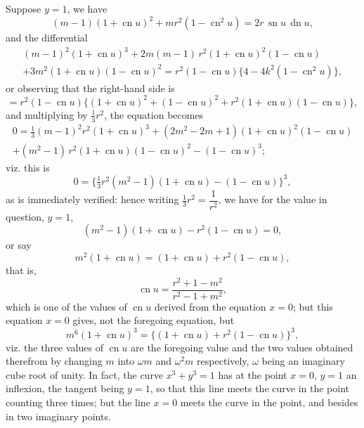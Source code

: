 \documentclass[11pt,a4paper]{article}
\theoremstyle{plain}
\theoremstyle{definition}
\theoremstyle{remark}
\begin{document}
Suppose $y=1$, we have
\[
(m-1)(1+\operatorname{cn} u)^2 + mr^2(1-\operatorname{cn}^2 u) = 2r\,\operatorname{sn} u\,\operatorname{dn} u,
\]
and the differential
\begin{multline*}
(m-1)^2(1+\operatorname{cn} u)^3 + 2m(m-1)\,r^2(1+\operatorname{cn} u)^2(1-\operatorname{cn} u)\\
+ 3m^2(1+\operatorname{cn} u)(1-\operatorname{cn} u)^2 = r^2(1-\operatorname{cn} u)\{4 - 4k^2(1-\operatorname{cn}^2 u)\},
\end{multline*}
or observing that the right-hand side is
\[
= r^2(1-\operatorname{cn} u)\{(1+\operatorname{cn} u)^2 + (1-\operatorname{cn} u)^2 + r^2(1+\operatorname{cn} u)(1-\operatorname{cn} u)\},
\]
and multiplying by $\tfrac{1}{3}r^2$, the equation becomes
\begin{multline*}
0 = \tfrac{1}{3}(m-1)^2 r^2 (1+\operatorname{cn} u)^3 + (2m^2 - 2m + 1)(1+\operatorname{cn} u)^2(1-\operatorname{cn} u)\\
+ (m^2-1)\,r^2(1+\operatorname{cn} u)(1-\operatorname{cn} u)^2 - (1-\operatorname{cn} u)^3;
\end{multline*}
viz. this is
\[
0 = \{\tfrac{1}{3}r^2(m^2-1)(1+\operatorname{cn} u) - (1-\operatorname{cn} u)\}^3,
\]
as is immediately verified: hence writing $\tfrac{1}{3}r^2 = \dfrac{1}{r^2}$, we have for the value in question, $y=1$,
\[
(m^2-1)(1+\operatorname{cn} u) - r^2(1-\operatorname{cn} u) = 0,
\]
or say
\[
m^2(1+\operatorname{cn} u) = (1+\operatorname{cn} u) + r^2(1-\operatorname{cn} u),
\]
that is,
\[
\operatorname{cn} u = \frac{r^2 + 1 - m^2}{r^2 - 1 + m^2},
\]
which is one of the values of $\operatorname{cn} u$ derived from the equation $x=0$; but this equation $x=0$ gives, not the foregoing equation, but
\[
m^6(1+\operatorname{cn} u)^3 = \{(1+\operatorname{cn} u) + r^2(1-\operatorname{cn} u)\}^3,
\]
viz. the three values of $\operatorname{cn} u$ are the foregoing value and the two values obtained therefrom by changing $m$ into $\omega m$ and $\omega^2 m$ respectively, $\omega$ being an imaginary cube root of unity. In fact, the curve $x^3 + y^3 = 1$ has at the point $x=0$, $y=1$ an inflexion, the tangent being $y=1$, so that this line meets the curve in the point counting three times; but the line $x=0$ meets the curve in the point, and besides in two imaginary points.



\newpage
\end{document}
